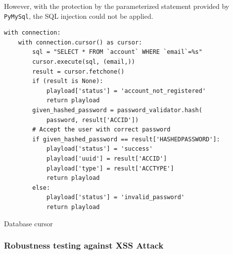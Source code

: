 \documentclass{article}
\begin{document}
However, with the protection by the parameterized statement provided by \verb|PyMySql|, the SQL injection could not be applied. 
\begin{listing}[!htp]
\begin{verbatim}
with connection:
    with connection.cursor() as cursor:
        sql = "SELECT * FROM `account` WHERE `email`=%s"
        cursor.execute(sql, (email,))
        result = cursor.fetchone()
        if (result is None):
            playload['status'] = 'account_not_registered'
            return playload
        given_hashed_password = password_validator.hash(
            password, result['ACCID'])
        # Accept the user with correct password
        if given_hashed_password == result['HASHEDPASSWORD']:
            playload['status'] = 'success'
            playload['uuid'] = result['ACCID']
            playload['type'] = result['ACCTYPE']
            return playload
        else:
            playload['status'] = 'invalid_password'
            return playload
\end{verbatim}
\caption{Database cursor}
\label{listing:cursor}
\end{listing}

\subsubsection{Robustness testing against XSS Attack}
\end{document}
